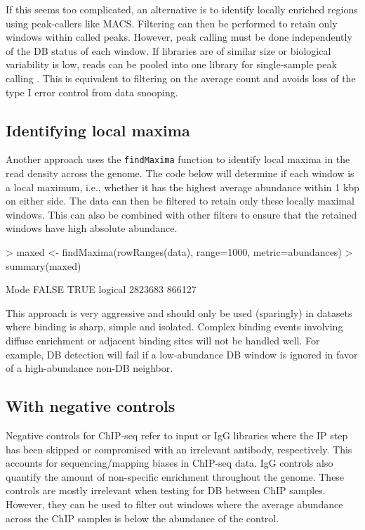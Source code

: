 \documentclass[12pt]{report}
\renewenvironment{Schunk}{\vspace{0pt}}{\vspace{0pt}}
\newcommand{\code}[1]{{\small\texttt{#1}}}
\newcommand{\macs}{MACS}
\begin{document}
If this seems too complicated, an alternative is to identify locally enriched regions using peak-callers like \macs{}. 
Filtering can then be performed to retain only windows within called peaks.  
However, peak calling must be done independently of the DB status of each window. 
If libraries are of similar size or biological variability is low, reads can be pooled into one library for single-sample peak calling \citep{lun2014}. 
This is equivalent to filtering on the average count and avoids loss of the type I error control from data snooping.

\subsection{Identifying local maxima}
\label{sec:localmax}
Another approach uses the \code{findMaxima} function to identify local maxima in the read density across the genome.
The code below will determine if each window is a local maximum, i.e., whether it has the highest average abundance within 1 kbp on either side.
The data can then be filtered to retain only these locally maximal windows.
This can also be combined with other filters to ensure that the retained windows have high absolute abundance.

\begin{Schunk}
\begin{Sinput}
> maxed <- findMaxima(rowRanges(data), range=1000, metric=abundances)
> summary(maxed)
\end{Sinput}
\begin{Soutput}
   Mode   FALSE    TRUE 
logical 2823683  866127 
\end{Soutput}
\end{Schunk}

This approach is very aggressive and should only be used (sparingly) in datasets where binding is sharp, simple and isolated.
Complex binding events involving diffuse enrichment or adjacent binding sites will not be handled well.
For example, DB detection will fail if a low-abundance DB window is ignored in favor of a high-abundance non-DB neighbor.

\subsection{With negative controls}
Negative controls for ChIP-seq refer to input or IgG libraries where the IP step has been skipped or compromised with an irrelevant antibody, respectively. 
This accounts for sequencing/mapping biases in ChIP-seq data. 
IgG controls also quantify the amount of non-specific enrichment throughout the genome. 
These controls are mostly irrelevant when testing for DB between ChIP samples. 
However, they can be used to filter out windows where the average abundance across the ChIP samples is below the abundance of the control. 
\end{document}
